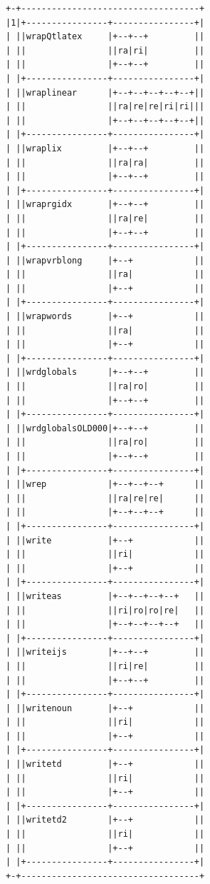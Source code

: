\documentclass[11pt,letter,landscape]{article}
\begin{document}
    \begin{Verbatim}[commandchars=\\\{\}]
+-+-----------------------------------+
|1|+----------------+----------------+|
| ||wrapQtlatex     |+--+--+         ||
| ||                ||ra|ri|         ||
| ||                |+--+--+         ||
| |+----------------+----------------+|
| ||wraplinear      |+--+--+--+--+--+||
| ||                ||ra|re|re|ri|ri|||
| ||                |+--+--+--+--+--+||
| |+----------------+----------------+|
| ||wraplix         |+--+--+         ||
| ||                ||ra|ra|         ||
| ||                |+--+--+         ||
| |+----------------+----------------+|
| ||wraprgidx       |+--+--+         ||
| ||                ||ra|re|         ||
| ||                |+--+--+         ||
| |+----------------+----------------+|
| ||wrapvrblong     |+--+            ||
| ||                ||ra|            ||
| ||                |+--+            ||
| |+----------------+----------------+|
| ||wrapwords       |+--+            ||
| ||                ||ra|            ||
| ||                |+--+            ||
| |+----------------+----------------+|
| ||wrdglobals      |+--+--+         ||
| ||                ||ra|ro|         ||
| ||                |+--+--+         ||
| |+----------------+----------------+|
| ||wrdglobalsOLD000|+--+--+         ||
| ||                ||ra|ro|         ||
| ||                |+--+--+         ||
| |+----------------+----------------+|
| ||wrep            |+--+--+--+      ||
| ||                ||ra|re|re|      ||
| ||                |+--+--+--+      ||
| |+----------------+----------------+|
| ||write           |+--+            ||
| ||                ||ri|            ||
| ||                |+--+            ||
| |+----------------+----------------+|
| ||writeas         |+--+--+--+--+   ||
| ||                ||ri|ro|ro|re|   ||
| ||                |+--+--+--+--+   ||
| |+----------------+----------------+|
| ||writeijs        |+--+--+         ||
| ||                ||ri|re|         ||
| ||                |+--+--+         ||
| |+----------------+----------------+|
| ||writenoun       |+--+            ||
| ||                ||ri|            ||
| ||                |+--+            ||
| |+----------------+----------------+|
| ||writetd         |+--+            ||
| ||                ||ri|            ||
| ||                |+--+            ||
| |+----------------+----------------+|
| ||writetd2        |+--+            ||
| ||                ||ri|            ||
| ||                |+--+            ||
| |+----------------+----------------+|
+-+-----------------------------------+
    \end{Verbatim}
\end{document}
